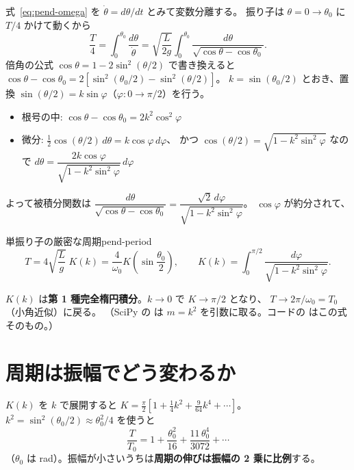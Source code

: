 式~\eqref{eq:pend-omega} を $\dot\theta=d\theta/dt$ とみて変数分離する。
振り子は $\theta=0\to\theta_0$ に $T/4$ かけて動くから
\begin{equation}
  \frac T4=\int_0^{\theta_0}\frac{d\theta}{\dot\theta}
  =\sqrt{\frac{L}{2g}}\int_0^{\theta_0}\frac{d\theta}{\sqrt{\cos\theta-\cos\theta_0}}.
\end{equation}
倍角の公式 $\cos\theta=1-2\sin^2(\theta/2)$ で書き換えると
$\cos\theta-\cos\theta_0=2\left[\sin^2(\theta_0/2)-\sin^2(\theta/2)\right]$。
$k=\sin(\theta_0/2)$ とおき、置換 $\sin(\theta/2)=k\sin\varphi$（$\varphi:0\to\pi/2$）を行う。
\begin{itemize}
  \item 根号の中: $\cos\theta-\cos\theta_0=2k^2\cos^2\varphi$
  \item 微分: $\tfrac12\cos(\theta/2)\,d\theta=k\cos\varphi\,d\varphi$、
    かつ $\cos(\theta/2)=\sqrt{1-k^2\sin^2\varphi}$ なので
    $d\theta=\dfrac{2k\cos\varphi}{\sqrt{1-k^2\sin^2\varphi}}\,d\varphi$
\end{itemize}
よって被積分関数は
$\dfrac{d\theta}{\sqrt{\cos\theta-\cos\theta_0}}=\dfrac{\sqrt2\,d\varphi}{\sqrt{1-k^2\sin^2\varphi}}$。
$\cos\varphi$ が約分されて、
\begin{result}{単振り子の厳密な周期}{pend-period}
\begin{equation}
  T=4\sqrt{\frac Lg}\;K(k)=\frac{4}{\omega_0}K\!\left(\sin\frac{\theta_0}{2}\right),
  \qquad
  K(k)=\int_0^{\pi/2}\frac{d\varphi}{\sqrt{1-k^2\sin^2\varphi}}.
  \label{eq:pend-period}
\end{equation}
\end{result}
$K(k)$ は\textbf{第 1 種完全楕円積分}。$k\to0$ で $K\to\pi/2$ となり、
$T\to2\pi/\omega_0=T_0$（小角近似）に戻る。
（SciPy の  は $m=k^2$ を引数に取る。コードの  はこの式そのもの。）

\section{周期は振幅でどう変わるか}\label{sec:pend-amplitude}

$K(k)$ を $k$ で展開すると $K=\tfrac\pi2\left[1+\tfrac14k^2+\tfrac9{64}k^4+\cdots\right]$。
$k^2=\sin^2(\theta_0/2)\approx\theta_0^2/4$ を使うと
\begin{equation}
  \frac{T}{T_0}=1+\frac{\theta_0^2}{16}+\frac{11\,\theta_0^4}{3072}+\cdots
  \label{eq:pend-expand}
\end{equation}
（$\theta_0$ は rad）。振幅が小さいうちは\textbf{周期の伸びは振幅の 2 乗に比例}する。


